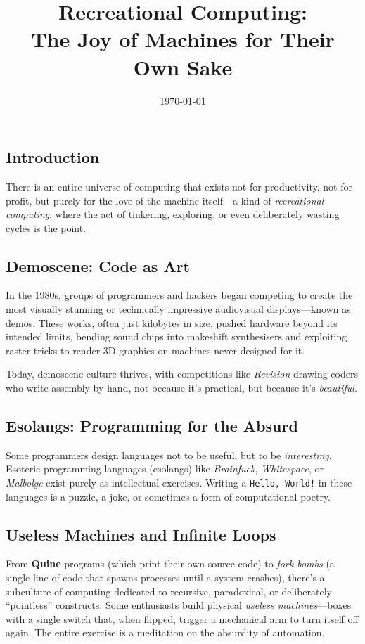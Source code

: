\documentclass[12pt]{article}
\title{Recreational Computing: \\The Joy of Machines for Their Own Sake}
\author{}
\date{\today}
\begin{document}
\maketitle

\subsection*{Introduction}
There is an entire universe of computing that exists not for productivity, not for profit, but purely for the love of the machine itself---a kind of \textit{recreational computing}, where the act of tinkering, exploring, or even deliberately wasting cycles is the point.

\subsection*{Demoscene: Code as Art}
In the 1980s, groups of programmers and hackers began competing to create the most visually stunning or technically impressive audiovisual displays---known as demos. These works, often just kilobytes in size, pushed hardware beyond its intended limits, bending sound chips into makeshift synthesisers and exploiting raster tricks to render 3D graphics on machines never designed for it. 

Today, demoscene culture thrives, with competitions like \textit{Revision} drawing coders who write assembly by hand, not because it’s practical, but because it’s \textit{beautiful}.

\subsection*{Esolangs: Programming for the Absurd}
Some programmers design languages not to be useful, but to be \textit{interesting}. Esoteric programming languages (esolangs) like \textit{Brainfuck}, \textit{Whitespace}, or \textit{Malbolge} exist purely as intellectual exercises. Writing a \texttt{Hello, World!} in these languages is a puzzle, a joke, or sometimes a form of computational poetry.

\subsection*{Useless Machines and Infinite Loops}
From \textbf{Quine} programs (which print their own source code) to \textit{fork bombs} (a single line of code that spawns processes until a system crashes), there’s a subculture of computing dedicated to recursive, paradoxical, or deliberately ``pointless'' constructs. Some enthusiasts build physical \textit{useless machines}---boxes with a single switch that, when flipped, trigger a mechanical arm to turn itself off again. The entire exercise is a meditation on the absurdity of automation.
\end{document}
